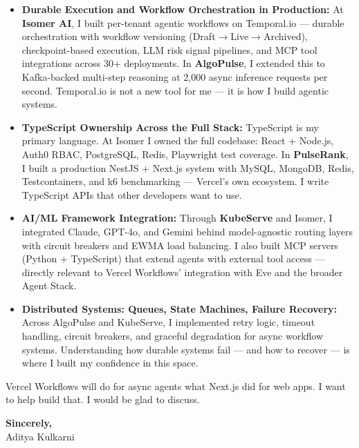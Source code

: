 \documentclass[11pt,letterpaper]{article}
\begin{document}
\vspace{4pt}
\begin{itemize}[leftmargin=*, itemsep=3pt, label={\color{VercelBlack}\faAngleRight}]
    \item \textbf{Durable Execution and Workflow Orchestration in Production:} At \textbf{Isomer AI}, I built per-tenant agentic workflows on Temporal.io --- durable orchestration with workflow versioning (Draft$\to$Live$\to$Archived), checkpoint-based execution, LLM risk signal pipelines, and MCP tool integrations across 30+ deployments. In \textbf{AlgoPulse}, I extended this to Kafka-backed multi-step reasoning at 2,000 async inference requests per second. Temporal.io is not a new tool for me --- it is how I build agentic systems.

    \item \textbf{TypeScript Ownership Across the Full Stack:} TypeScript is my primary language. At Isomer I owned the full codebase: React + Node.js, Auth0 RBAC, PostgreSQL, Redis, Playwright test coverage. In \textbf{PulseRank}, I built a production NestJS + Next.js system with MySQL, MongoDB, Redis, Testcontainers, and k6 benchmarking --- Vercel's own ecosystem. I write TypeScript APIs that other developers want to use.

    \item \textbf{AI/ML Framework Integration:} Through \textbf{KubeServe} and Isomer, I integrated Claude, GPT-4o, and Gemini behind model-agnostic routing layers with circuit breakers and EWMA load balancing. I also built MCP servers (Python + TypeScript) that extend agents with external tool access --- directly relevant to Vercel Workflows' integration with Eve and the broader Agent Stack.

    \item \textbf{Distributed Systems: Queues, State Machines, Failure Recovery:} Across AlgoPulse and KubeServe, I implemented retry logic, timeout handling, circuit breakers, and graceful degradation for async workflow systems. Understanding how durable systems fail --- and how to recover --- is where I built my confidence in this space.
\end{itemize}
\vspace{6pt}

Vercel Workflows will do for async agents what Next.js did for web apps. I want to help build that. I would be glad to discuss.

\vspace{12pt}
\textbf{Sincerely,}\\[8pt]
Aditya Kulkarni
\end{document}
